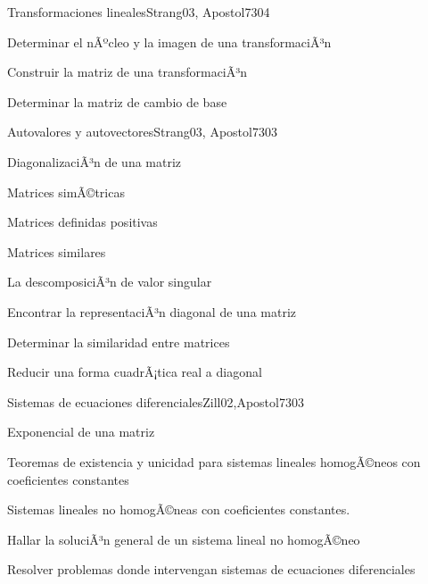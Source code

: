 \begin{syllabus}
\begin{unit}{Transformaciones lineales}{Strang03, Apostol73}{0}{4}
   \begin{unitgoals}
      \item Determinar el nÃºcleo y la imagen de una transformaciÃ³n
      \item Construir la matriz de una transformaciÃ³n
      \item Determinar la matriz de cambio de base
      \end{unitgoals}
\end{unit}

\begin{unit}{Autovalores y autovectores}{Strang03, Apostol73}{0}{3}
\begin{topics}
      \item DiagonalizaciÃ³n de una matriz
      \item Matrices simÃ©tricas
      \item Matrices definidas positivas
      \item Matrices similares
      \item La descomposiciÃ³n de valor singular
  \end{topics}

   \begin{unitgoals}
      \item Encontrar la representaciÃ³n diagonal de una matriz
      \item Determinar la similaridad entre matrices
      \item Reducir una forma cuadrÃ¡tica real a diagonal
   \end{unitgoals}
\end{unit}

\begin{unit}{Sistemas de ecuaciones diferenciales}{Zill02,Apostol73}{0}{3}
\begin{topics}
      \item Exponencial de una matriz
      \item Teoremas de existencia y unicidad para sistemas lineales homogÃ©neos con coeficientes constantes
      \item Sistemas lineales no homogÃ©neas con coeficientes constantes.
    \end{topics}

   \begin{unitgoals}
      \item Hallar la soluciÃ³n general de un sistema lineal no  homogÃ©neo
      \item Resolver problemas donde intervengan sistemas de ecuaciones diferenciales
   \end{unitgoals}
\end{unit}


\end{syllabus}
